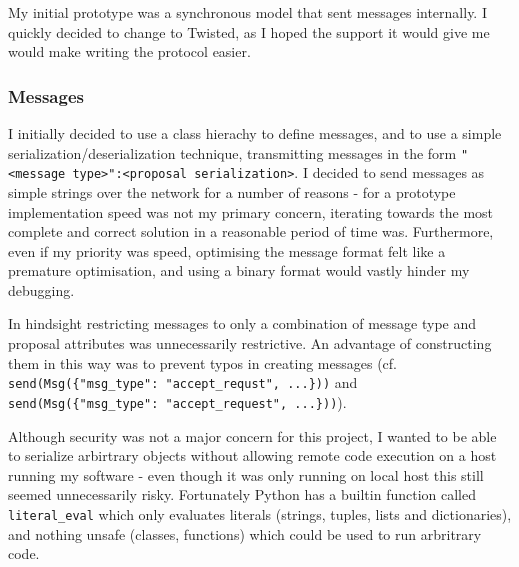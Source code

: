 \documentclass[12pt,twoside,notitlepage]{report}
\begin{document}
My initial prototype was a synchronous model that sent messages internally. I quickly decided to
change to Twisted, as I hoped the support it would give me would make writing the protocol easier.

\subsubsection*{Messages}

\label{sec:message-serialization}

I initially decided to use a class hierachy to define messages, and to use a simple
serialization/deserialization technique, transmitting messages in the form
\verb+"<message type>":<proposal serialization>+. I decided to send messages as simple strings
over the network for a number of reasons - for a prototype implementation speed was not my primary
concern, iterating towards the most complete and correct solution in a reasonable period of time
was. Furthermore, even if my priority was speed, optimising the message format felt like a
premature optimisation, and using a binary format would vastly hinder my debugging.

In hindsight restricting messages to only a combination of message type and proposal attributes
was unnecessarily restrictive. An advantage of constructing them in this way was to prevent typos
in creating messages (cf. \verb+send(Msg({"msg_type": "accept_requst", ...}))+
and \verb+send(Msg({"msg_type": "accept_request", ...}))+).

Although security was not a major concern for this project, I wanted to be able to serialize
arbirtrary objects without allowing remote code execution on a host running my software - even
though it was only running on local host this still seemed unnecessarily risky. Fortunately Python
has a builtin function called \verb+literal_eval+ which only evaluates literals (strings, tuples,
lists and dictionaries), and nothing unsafe (classes, functions) which could be used to run
arbritrary code.
\end{document}
